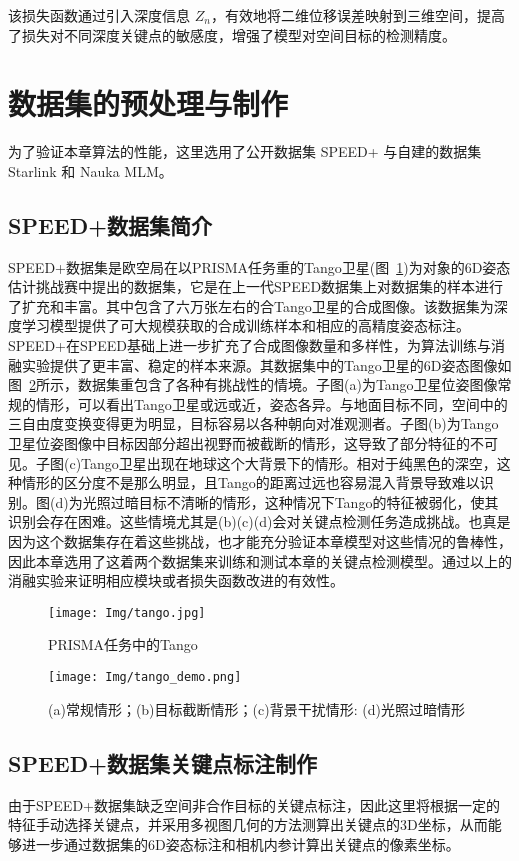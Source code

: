该损失函数通过引入深度信息 $Z_n$，有效地将二维位移误差映射到三维空间，提高了损失对不同深度关键点的敏感度，增强了模型对空间目标的检测精度。

\section{数据集的预处理与制作}
为了验证本章算法的性能，这里选用了公开数据集 SPEED+ 与自建的数据集 Starlink 和 Nauka MLM。
\subsection{SPEED+数据集简介}
SPEED+数据集\cite{speed+}是欧空局在以PRISMA任务重的Tango卫星(图~\ref{fig:tango})为对象的6D姿态估计挑战赛中提出的数据集，它是在上一代SPEED\cite{SPEED-Dataset}数据集上对数据集的样本进行了扩充和丰富。其中包含了六万张左右的合Tango卫星的合成图像。该数据集为深度学习模型提供了可大规模获取的合成训练样本和相应的高精度姿态标注。SPEED+在SPEED基础上进一步扩充了合成图像数量和多样性，为算法训练与消融实验提供了更丰富、稳定的样本来源。其数据集中的Tango卫星的6D姿态图像如图~\ref{fig:tango_demo}所示，数据集重包含了各种有挑战性的情境。子图(a)为Tango卫星位姿图像常规的情形，可以看出Tango卫星或远或近，姿态各异。与地面目标不同，空间中的三自由度变换变得更为明显，目标容易以各种朝向对准观测者。子图(b)为Tango卫星位姿图像中目标因部分超出视野而被截断的情形，这导致了部分特征的不可见。子图(c)Tango卫星出现在地球这个大背景下的情形。相对于纯黑色的深空，这种情形的区分度不是那么明显，且Tango的距离过远也容易混入背景导致难以识别。图(d)为光照过暗目标不清晰的情形，这种情况下Tango的特征被弱化，使其识别会存在困难。这些情境尤其是(b)(c)(d)会对关键点检测任务造成挑战。也真是因为这个数据集存在着这些挑战，也才能充分验证本章模型对这些情况的鲁棒性，因此本章选用了这着两个数据集来训练和测试本章的关键点检测模型。通过以上的消融实验来证明相应模块或者损失函数改进的有效性。
\begin{figure}[htbp]
	\centering
	\texttt{[image: Img/tango.jpg]}
	\caption{PRISMA任务中的Tango}
	\label{fig:tango}
\end{figure}


\begin{figure}[htbp]
	\centering
	\texttt{[image: Img/tango\_demo.png]}
	\caption{(a)常规情形；(b)目标截断情形；(c)背景干扰情形: (d)光照过暗情形}
	\label{fig:tango_demo}
\end{figure}
\subsection{SPEED+数据集关键点标注制作}
由于SPEED+数据集缺乏空间非合作目标的关键点标注，因此这里将根据一定的特征手动选择关键点，并采用多视图几何的方法测算出关键点的3D坐标，从而能够进一步通过数据集的6D姿态标注和相机内参计算出关键点的像素坐标。

